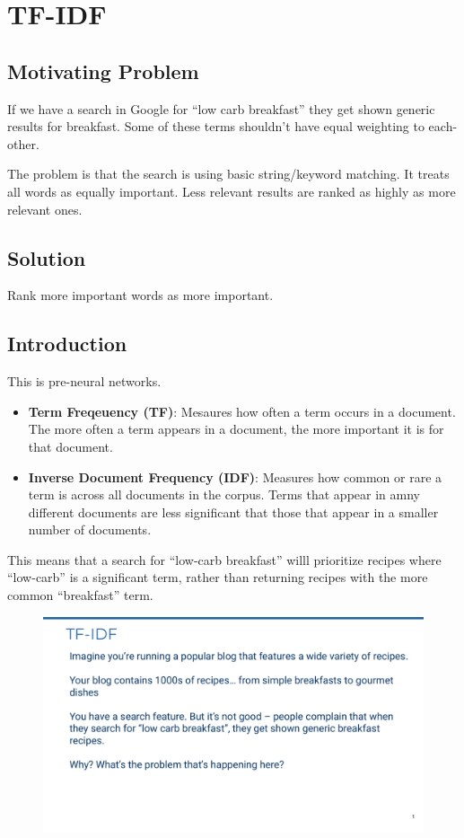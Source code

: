 \documentclass[11pt]{article}
\begin{document}


\tableofcontents

\clearpage

\section{TF-IDF}

\subsection{Motivating Problem}

If we have a search in Google for ``low carb breakfast'' they get shown generic results for breakfast. Some of these terms shouldn't have equal weighting to each-other.

The problem is that the search is using basic string/keyword matching. It treats all words as equally important. Less relevant results are ranked as highly as more relevant ones.

\subsection{Solution}

Rank more important words as more important.

\subsection{Introduction}

This is pre-neural networks.

\begin{itemize}
    \item \textbf{Term Freqeuency (TF)}: Mesaures how often a term occurs in a document. The more often a term appears in a document, the more important it is for that document.
    \item \textbf{Inverse Document Frequency (IDF)}: Measures how common or rare a term is across all documents in the corpus. Terms that appear in amny different documents are less significant that those that appear in a smaller number of documents.
\end{itemize}

This means that a search for ``low-carb breakfast'' willl prioritize recipes where ``low-carb'' is a significant term, rather than returning recipes with the more common ``breakfast'' term.

\begin{figure}[H]
    \centering
    \includegraphics[page=7, width=\linewidth]{TF-IDF.pdf}
    \caption*{}
\end{figure}

\end{document}

